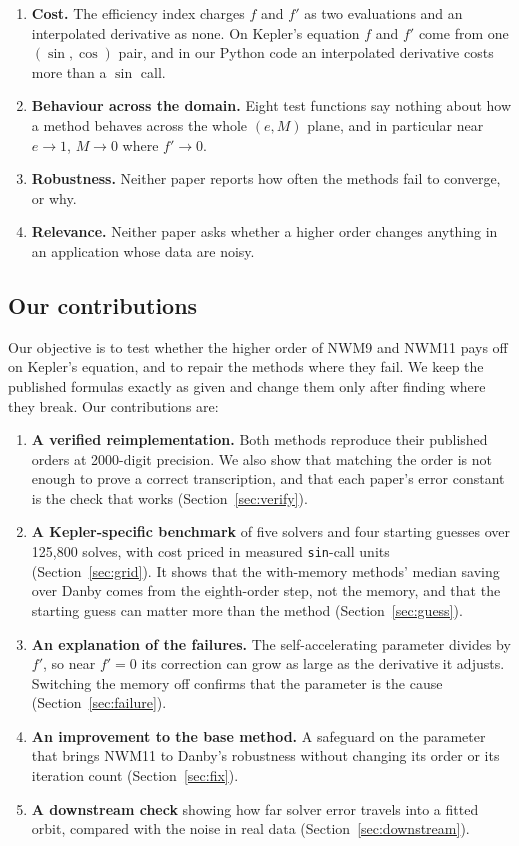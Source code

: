 \documentclass[sigconf,nonacm]{acmart}
\begin{document}
\begin{enumerate}
\item \textbf{Cost.} The efficiency index charges $f$ and $f'$ as two
      evaluations and an interpolated derivative as none. On Kepler's
      equation $f$ and $f'$ come from one $(\sin, \cos)$ pair, and in our
      Python code an interpolated derivative costs more than a $\sin$ call.
\item \textbf{Behaviour across the domain.} Eight test functions say
      nothing about how a method behaves across the whole $(e, M)$ plane,
      and in particular near $e \to 1$, $M \to 0$ where $f' \to 0$.
\item \textbf{Robustness.} Neither paper reports how often the methods
      fail to converge, or why.
\item \textbf{Relevance.} Neither paper asks whether a higher order changes
      anything in an application whose data are noisy.
\end{enumerate}

\subsection{Our contributions}

Our objective is to test whether the higher order of NWM9 and NWM11 pays
off on Kepler's equation, and to repair the methods where they fail. We
keep the published formulas exactly as given and change them only after
finding where they break. Our contributions are:

\begin{enumerate}
\item \textbf{A verified reimplementation.} Both methods reproduce their
      published orders at 2000-digit precision. We also show that matching
      the order is not enough to prove a correct transcription, and that
      each paper's error constant is the check that works
      (Section~\ref{sec:verify}).
\item \textbf{A Kepler-specific benchmark} of five solvers and four
      starting guesses over 125{,}800 solves, with cost priced in measured
      \texttt{sin}-call units (Section~\ref{sec:grid}). It shows that the
      with-memory methods' median saving over Danby comes from the
      eighth-order step, not the memory, and that the starting guess can
      matter more than the method (Section~\ref{sec:guess}).
\item \textbf{An explanation of the failures.} The self-accelerating
      parameter divides by $f'$, so near $f' = 0$ its correction can grow as
      large as the derivative it adjusts. Switching the memory off
      confirms that the parameter is the cause (Section~\ref{sec:failure}).
\item \textbf{An improvement to the base method.} A safeguard on the
      parameter that brings NWM11 to Danby's robustness without changing
      its order or its iteration count (Section~\ref{sec:fix}).
\item \textbf{A downstream check} showing how far solver error travels
      into a fitted orbit, compared with the noise in real data
      (Section~\ref{sec:downstream}).
\end{enumerate}
\end{document}

